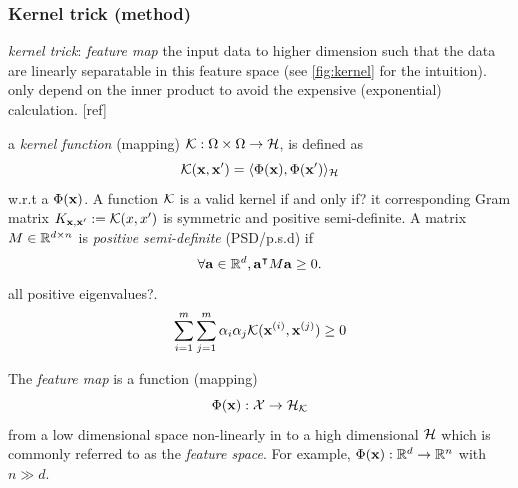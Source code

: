 \subsubsection{Kernel trick (method)}
\emph{kernel trick}: \emph{feature map} the input data to higher dimension such that the data are linearly separatable in this feature space (see \cref{fig:kernel} for the intuition).
only depend on the inner product to avoid the expensive (exponential) calculation. [ref]
\begin{definition}\label{def:kernel}
	a \emph{kernel function} (mapping) $\mathcal{K}: \Omega\times\Omega\to\mathcal{H}$,
	is defined as 
	\begin{equation}
		\mathcal{K}(\vb{x},\vb{x}') = \langle \Phi(\vb{x}),\Phi(\vb{x}') \rangle_{\mathcal{H}}
		\label{eq:kernel_classical}
	\end{equation}
	w.r.t a  $\Phi(\vb{x})$.
	A function $\mathcal{K}$ is a valid kernel if and only if? it corresponding Gram matrix $K_{\vb{x},\vb{x}'}:=\mathcal{K}(x,x')$ is symmetric and positive semi-definite.
	A matrix $M\in\mathbb{R}^{d\times n}$ is \emph{positive semi-definite} (PSD/p.s.d) if
	\begin{equation}
		\forall \vb{a} \in \mathbb{R}^d, \vb{a}^\intercal M \vb{a} \ge 0.
	\end{equation}
	all positive eigenvalues?.
	\begin{equation}
		\sum_{i=1}^m \sum_{j=1}^m \alpha_i\alpha_j \mathcal{K}(\vb{x}^{(i)},\vb{x}^{(j)}) \ge 0
	\end{equation}
\end{definition}
\begin{definition}\label{def:feature_map_classical}
	The \emph{feature map} is a function (mapping)
	\begin{equation}
		\Phi(\vb{x}) : \mathcal{X} \to \mathcal{H}_{\mathcal{K}}
		\label{eq:feature_map_classical}
	\end{equation}
	from a low dimensional space non-linearly in to a high dimensional  $\mathcal{H}$ which is commonly referred to as the \emph{feature space}.
	For example, $\Phi(\vb{x}):\mathbb{R}^d \to \mathbb{R}^n$ with $n\gg d$.
\end{definition}
